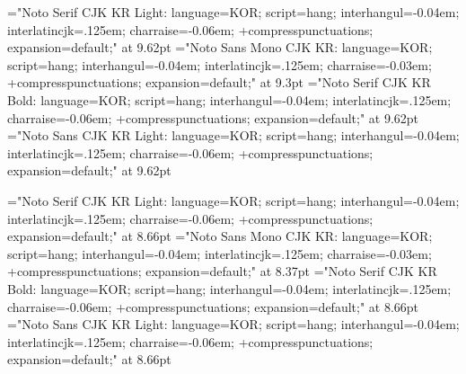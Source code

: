 %

\sethangulfont\tenmj="Noto Serif CJK KR Light:%
  language=KOR;%
  script=hang;%
  interhangul=-0.04em;%
  interlatincjk=.125em;%
  charraise=-0.06em;%
  +compresspunctuations;%
  expansion=default;" at 9.62pt
\sethangulfont\tentz="Noto Sans Mono CJK KR:%
  language=KOR;%
  script=hang;%
  interhangul=-0.04em;%
  interlatincjk=.125em;%
  charraise=-0.03em;%
  +compresspunctuations;%
  expansion=default;" at 9.3pt
\sethangulfont\tenbd="Noto Serif CJK KR Bold:%
  language=KOR;%
  script=hang;%
  interhangul=-0.04em;%
  interlatincjk=.125em;%
  charraise=-0.06em;%
  +compresspunctuations;%
  expansion=default;" at 9.62pt
\sethangulfont\tengt="Noto Sans CJK KR Light:%
  language=KOR;%
  script=hang;%
  interhangul=-0.04em;%
  interlatincjk=.125em;%
  charraise=-0.06em;%
  +compresspunctuations;%
  expansion=default;" at 9.62pt

\sethangulfont\ninemj="Noto Serif CJK KR Light:%
  language=KOR;%
  script=hang;%
  interhangul=-0.04em;%
  interlatincjk=.125em;%
  charraise=-0.06em;%
  +compresspunctuations;%
  expansion=default;" at 8.66pt
\sethangulfont\ninetz="Noto Sans Mono CJK KR:%
  language=KOR;%
  script=hang;%
  interhangul=-0.04em;%
  interlatincjk=.125em;%
  charraise=-0.03em;%
  +compresspunctuations;%
  expansion=default;" at 8.37pt
\sethangulfont\ninebd="Noto Serif CJK KR Bold:%
  language=KOR;%
  script=hang;%
  interhangul=-0.04em;%
  interlatincjk=.125em;%
  charraise=-0.06em;%
  +compresspunctuations;%
  expansion=default;" at 8.66pt
\sethangulfont\ninegt="Noto Sans CJK KR Light:%
  language=KOR;%
  script=hang;%
  interhangul=-0.04em;%
  interlatincjk=.125em;%
  charraise=-0.06em;%
  +compresspunctuations;%
  expansion=default;" at 8.66pt

